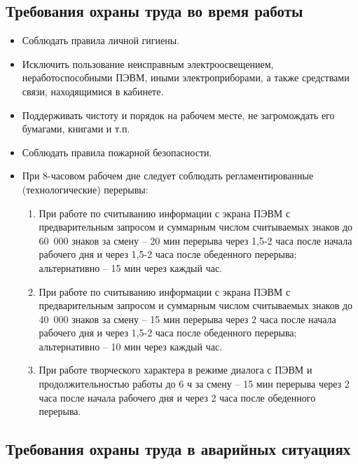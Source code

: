\tocless\subsection{Требования охраны труда во время работы}

\begin{itemize}
    \item Соблюдать правила личной гигиены.
    \item Исключить пользование неисправным электроосвещением, неработоспособными ПЭВМ, иными электроприборами, а также средствами связи, находящимися в кабинете.
    \item Поддерживать чистоту и порядок на рабочем месте, не загромождать его бумагами, книгами и т.п.
    \item Соблюдать правила пожарной безопасности.
    \item При 8-часовом рабочем дне следует соблюдать регламентированные (технологические) перерывы:
    \begin{enumerate}
        \item При работе по считыванию информации с экрана ПЭВМ с предварительным запросом и суммарным числом считываемых знаков до 60 000 знаков за смену – 20 мин перерыва через 1,5-2 часа после начала рабочего дня и через 1,5-2 часа после обеденного перерыва; альтернативно – 15 мин через каждый час.
        \item При работе по считыванию информации с экрана ПЭВМ с предварительным запросом и суммарным числом считываемых знаков до 40 000 знаков за смену –  15 мин перерыва через 2 часа после начала рабочего дня и через 1,5-2 часа после обеденного перерыва; альтернативно – 10 мин через каждый час.
        \item При работе творческого характера в режиме диалога с ПЭВМ и продолжительностью работы до 6 ч за смену –  15 мин перерыва через 2 часа после начала рабочего дня и через 2 часа после обеденного перерыва.
    \end{enumerate}
\end{itemize}

\tocless\subsection{Требования охраны труда в аварийных ситуациях}

